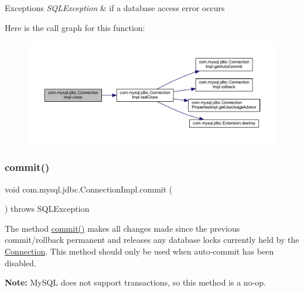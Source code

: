 \begin{DoxyExceptions}{Exceptions}
{\em S\+Q\+L\+Exception} & if a database access error occurs \\
\hline
\end{DoxyExceptions}
Here is the call graph for this function\+:\nopagebreak
\begin{figure}[H]
\begin{center}
\leavevmode
\includegraphics[width=350pt]{classcom_1_1mysql_1_1jdbc_1_1_connection_impl_a9499cd266206c66001685b386c6a6b43_cgraph}
\end{center}
\end{figure}
\mbox{\label{classcom_1_1mysql_1_1jdbc_1_1_connection_impl_aa2c8c829d30458f22f7785396eb18af1}} 
\subsubsection{\texorpdfstring{commit()}{commit()}}
{\footnotesize\ttfamily void com.\+mysql.\+jdbc.\+Connection\+Impl.\+commit (\begin{DoxyParamCaption}{ }\end{DoxyParamCaption}) throws S\+Q\+L\+Exception}

The method \mbox{\hyperlink{classcom_1_1mysql_1_1jdbc_1_1_connection_impl_aa2c8c829d30458f22f7785396eb18af1}{commit()}} makes all changes made since the previous commit/rollback permanent and releases any database locks currently held by the \mbox{\hyperlink{interfacecom_1_1mysql_1_1jdbc_1_1_connection}{Connection}}. This method should only be used when auto-\/commit has been disabled. 

{\bfseries Note\+:} My\+S\+QL does not support transactions, so this method is a no-\/op. 


